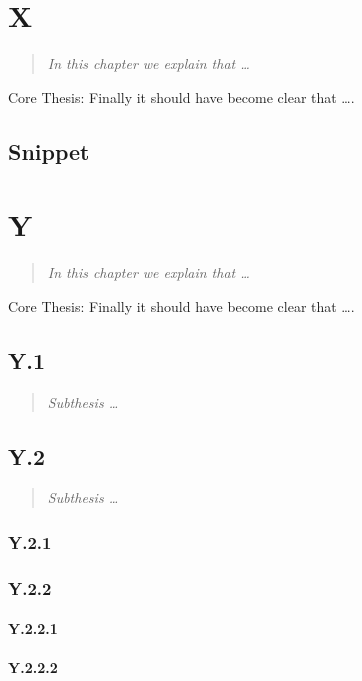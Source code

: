 \documentclass[
  DIV=calc,
  BCOR=5mm,
  11pt,
  headings=small,
  oneside,
  abstract=true,
  toc=bib,
  ngerman,english]{scrbook}
\begin{document}
\chapter{X}
\begin{quote}\itshape
In this chapter we explain that \ldots
\end{quote} 

Core Thesis: Finally it should have become clear that \ldots.

\section{Snippet}


\chapter{Y}
\begin{quote}\itshape
In this chapter we explain that \ldots
\end{quote} 

Core Thesis: Finally it should have become clear that \ldots.

\section{Y.1}
\begin{quote}\itshape
Subthesis \ldots
\end{quote} 

\section{Y.2}
\begin{quote}\itshape
Subthesis \ldots
\end{quote} 

\subsection{Y.2.1}

\subsection{Y.2.2}

\subsubsection{Y.2.2.1}
\subsubsection{Y.2.2.2}
\end{document}
